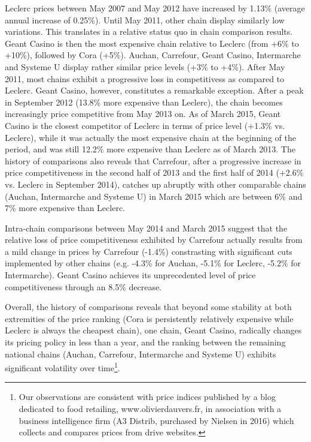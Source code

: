 \documentclass[english]{article}
\begin{document}
Leclerc prices between May 2007 and May 2012 have increased by 1.13\% (average annual increase of 0.25\%). Until May 2011, other chain display similarly low variations. This translates in a relative status quo in chain comparison results. Geant Casino is then the most expensive chain relative to Leclerc (from +6\% to +10\%), followed by Cora (+5\%). Auchan, Carrefour, Geant Casino, Intermarche and Systeme U display rather similar price levels (+3\% to +4\%). After May 2011, most chains exhibit a progressive loss in competitivess as compared to Leclerc. Geant Casino, however, constitutes a remarkable exception. After a peak in September 2012 (13.8\% more expensive than Leclerc), the chain becomes increasingly price competitive from May 2013 on. As of March 2015, Geant Casino is the closest competitor of Leclerc in terms of price level (+1.3\% vs. Leclerc), while it was actually the most expensive chain at the beginning of the period, and was still 12.2\% more expensive than Leclerc as of March 2013. The history of comparisons also reveals that Carrefour, after a progressive increase in price competitiveness in the second half of 2013 and the first half of 2014 (+2.6\% vs. Leclerc in September 2014), catches up abruptly with other comparable chains (Auchan, Intermarche and Systeme U) in March 2015 which are between 6\% and 7\% more expensive than Leclerc.

Intra-chain comparisons between May 2014 and March 2015 suggest that the relative loss of price competitiveness exhibited by Carrefour actually results from a mild change in prices by Carrefour (-1.4\%) constrasting with significant cuts implemented by other chains (e.g. -4.3\% for Auchan, -5.1\% for Leclerc, -5.2\% for Intermarche). Geant Casino achieves its unprecedented level of price competitiveness through an 8.5\% decrease.

Overall, the history of comparisons reveals that beyond some stability at both extremities of the price ranking (Cora is persistently relatively expensive while Leclerc is always the cheapest chain), one chain, Geant Casino, radically changes its pricing policy in less than a year, and the ranking between the remaining national chains (Auchan, Carrefour, Intermarche and Systeme U) exhibits significant volatility over time\footnote{Our observations are consistent with price indices published by a blog dedicated to food retailing, www.olivierdauvers.fr, in association with a business intelligence firm (A3 Distrib, purchased by Nielsen in 2016) which collects and compares prices from drive websites.}.
\end{document}
